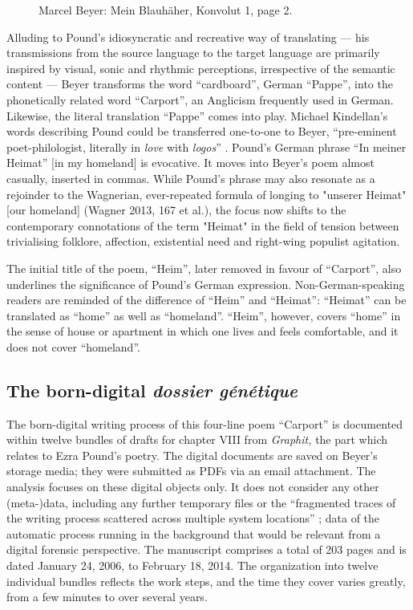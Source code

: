\begin{paper}
\begin{figure}[ph]
    \centering
    \caption{Marcel Beyer: Mein Blauhäher, Konvolut 1, page 2.}
    \label{fig:wix3}
\end{figure}


Alluding to Pound's idiosyncratic and recreative way of translating
\citep{hesse_tertium_2001} –– his transmissions from the source language to the target
language are primarily inspired by visual, sonic and rhythmic
perceptions, irrespective of the semantic content –– Beyer transforms
the word ``cardboard'', German ``Pappe'', into the phonetically related
word ``Carport'', an Anglicism frequently used in German. Likewise, the
literal translation ``Pappe'' comes into play. Michael Kindellan's words
describing Pound could be transferred one-to-one to Beyer, ``pre-eminent
poet-philologist, literally in \emph{love} with \emph{logos}''
\citep[1]{Kindellan_late_2017}. Pound's German phrase ``In meiner Heimat'' [in my homeland] is
evocative. It moves into Beyer's poem almost casually, inserted in
commas. While Pound's phrase may also resonate as a rejoinder to the
Wagnerian, ever-repeated formula of longing to "unserer Heimat" [our
homeland] (Wagner 2013, 167 et al.), the focus now shifts to the
contemporary connotations of the term "Heimat" in the field of tension
between trivialising folklore, affection, existential need and right-wing
populist agitation.

The initial title of the poem, ``Heim'', later removed in favour of
``Carport'', also underlines the significance of Pound's German
expression. Non-German-speaking readers are reminded of the difference
of ``Heim'' and ``Heimat'': ``Heimat'' can be translated as ``home'' as
well as ``homeland''. ``Heim'', however, covers ``home'' in the sense of
house or apartment in which one lives and feels comfortable, and it does
not cover ``homeland''.



\subsection*{The born-digital \emph{dossier génétique}}

The born-digital writing process of this four-line poem ``Carport'' is
documented within twelve bundles of drafts for chapter VIII from
\emph{Graphit,} the part which relates to Ezra Pound's poetry. The
digital documents are saved on Beyer's storage media; they were
submitted as PDFs via an email attachment. The analysis focuses on these
digital objects only. It does not consider any other (meta-)data,
including any further temporary files or the ``fragmented traces of the
writing process scattered across multiple system locations'' \citep[391]{ries_rationale_2018}; data of the automatic process running in the background that would
be relevant from a digital forensic perspective. The manuscript
comprises a total of 203 pages and is dated January 24, 2006, to
February 18, 2014. The organization into twelve individual bundles
reflects the work steps, and the time they cover varies greatly, from a
few minutes to over several years.


\end{paper}
